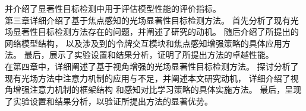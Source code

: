 并介绍了显著性目标检测中用于评估模型性能的评价指标。
\\
%
%
%
%
\indent
第三章详细介绍了基于焦点感知的光场显著性目标检测方法。
首先分析了现有光场显著性目标检测方法存在的问题，并阐述了研究的动机。
随后介绍了所提出的网络模型结构，
以及涉及到的令牌交互模块和焦点感知增强策略的具体应用方法。
最后，展示了实验设置和结果分析，证明了所提出方法的卓越性能。
\\
%
%
%
%
\indent
在第四章中，详细阐述了基于视角增强的光场显著性目标检测方法。
探讨分析了现有光场方法中注意力机制的应用与不足，并阐述本文研究动机，
详细介绍了视角增强注意力机制的框架结构
和感知对比学习策略的具体实施方法。
最后，呈现了实验设置和结果分析，以验证所提出方法的显著优势。































